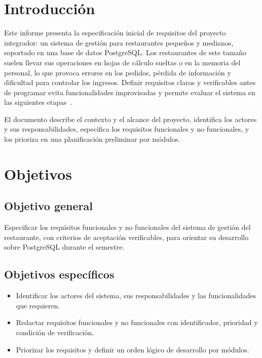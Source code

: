 \documentclass[12pt,a4paper,oneside]{article}
\begin{document}
\setcounter{page}{1}
\tableofcontents
\clearpage
{}
\section{Introducción}
Este informe presenta la especificación inicial de requisitos del proyecto integrador: un sistema de gestión para restaurantes pequeños y medianos, soportado en una base de datos PostgreSQL. Los restaurantes de este tamaño suelen llevar sus operaciones en hojas de cálculo sueltas o en la memoria del personal, lo que provoca errores en los pedidos, pérdida de información y dificultad para controlar los ingresos. Definir requisitos claros y verificables antes de programar evita funcionalidades improvisadas y permite evaluar el sistema en las siguientes etapas~\cite{ieee29148}.

El documento describe el contexto y el alcance del proyecto, identifica los actores y sus responsabilidades, especifica los requisitos funcionales y no funcionales, y los prioriza en una planificación preliminar por módulos.

\section{Objetivos}
\subsection{Objetivo general}
Especificar los requisitos funcionales y no funcionales del sistema de gestión del restaurante, con criterios de aceptación verificables, para orientar su desarrollo sobre PostgreSQL durante el semestre.
\subsection{Objetivos específicos}
\begin{itemize}[leftmargin=1.8em,itemsep=3pt]
\item Identificar los actores del sistema, sus responsabilidades y las funcionalidades que requieren.
\item Redactar requisitos funcionales y no funcionales con identificador, prioridad y condición de verificación.
\item Priorizar los requisitos y definir un orden lógico de desarrollo por módulos.
\end{itemize}
\end{document}
